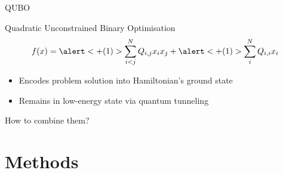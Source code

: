 \documentclass{beamer}
\begin{document}
\begin{frame}{QUBO}
    \pause
    \begin{block}{Quadratic Unconstrained Binary Optimisation}
        \vspace{0.1em}
        \begin{equation*}
            f(x)=\alert<+(1)>{\sum^N_{i<j}Q_{i,j}x_ix_j} + \alert<+(1)>{\sum^N_iQ_{i,i}x_i}
        \end{equation*}
    \end{block}
    \pause
    \begin{itemize}
        \item Encodes problem solution into Hamiltonian's ground state
        \item Remains in low-energy state via quantum tunneling
    \end{itemize}

\end{frame}

\begin{frame}[standout]
    How to combine them?

\end{frame}

\section{Methods} %
\end{document}
